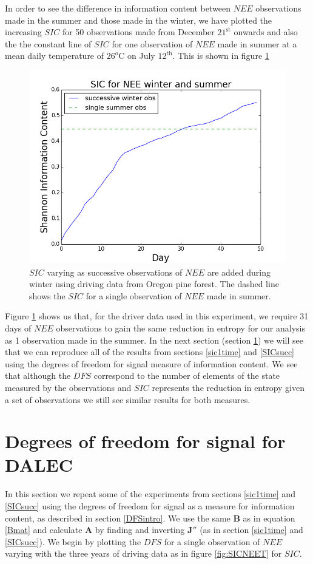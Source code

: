 \documentclass[11pt]{article}
\begin{document}
In order to see the difference in information content between $NEE$ observations made in the summer and those made in the winter, we have plotted the increasing $SIC$ for 50 observations made from December $21^{\text{st}}$ onwards and also the the constant line of $SIC$ for one observation of $NEE$ made in summer at a mean daily temperature of $26^{o}\text{C}$ on July $12^{\text{th}}$. This is shown in figure \ref{summwintsic}

\begin{figure}[H]
\centering
\includegraphics[height=.34\textwidth]{succwinter_singlesummer.png}
\caption{$SIC$ varying as successive observations of $NEE$ are added during winter using driving data from Oregon pine forest. The dashed line shows the $SIC$ for a single observation of $NEE$ made in summer.}
\label{summwintsic}
\end{figure}

Figure \ref{summwintsic} shows us that, for the driver data used in this experiment, we require 31 days of $NEE$ observations to gain the same reduction in entropy for our analysis as 1 observation made in the summer. In the next section (section \ref{DOFS}) we will see that we can reproduce all of the results from sections \ref{sic1time} and \ref{SICsucc} using the degrees of freedom for signal measure of information content. We see that although the $DFS$ correspond to the number of elements of the state measured by the observations and $SIC$ represents the reduction in entropy given a set of observations we still see similar results for both measures.

\section{Degrees of freedom for signal for DALEC} \label{DOFS}%

In this section we repeat some of the experiments from sections \ref{sic1time} and \ref{SICsucc} using the degrees of freedom for signal as a  measure for information content, as described in section \ref{DFSintro}. We use the same $\mathbf{B}$ as in equation \ref{Bmat} and calculate $\mathbf{A}$ by finding and inverting $\mathbf{J}''$ (as in section \ref{sic1time} and \ref{SICsucc}). We begin by plotting the $DFS$ for a single observation of $NEE$ varying with the three years of driving data as in figure \ref{fig:SICNEET} for $SIC$.
\end{document}
